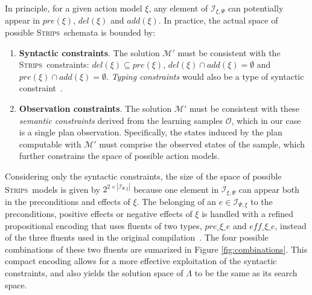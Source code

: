 \documentclass[runningheads]{llncs}
\newcommand{\strips}{\textsc{Strips}}     %
\begin{document}
In principle, for a given action model $\xi$, any element of ${\mathcal I}_{\xi,\Psi}$ can potentially appear in $pre(\xi)$, $del(\xi)$ and $add(\xi)$. In practice, the actual space of possible \strips\ schemata is bounded by:
\begin{enumerate}
\item {\bf Syntactic constraints}. The solution $\mathcal{M}'$ must be consistent with the \strips\ constraints: $del(\xi)\subseteq pre(\xi)$, $del(\xi)\cap add(\xi)=\emptyset$ and $pre(\xi)\cap add(\xi)=\emptyset$. {\em Typing constraints} would also be a type of syntactic constraint~\cite{mcdermott1998pddl}.
\item {\bf Observation constraints}. The solution $\mathcal{M}'$ must be consistent with these \emph{semantic constraints} derived from  the learning samples $\mathcal{O}$, which in our case is a single plan observation. Specifically, the states induced by the plan computable with $\mathcal{M}'$ must comprise the observed states of the sample, which further constrains the space of possible action models.
\end{enumerate}

Considering only the syntactic constraints, the size of the space of possible \strips\ models is given by $2^{2\times|{\mathcal I}_{\Psi,\xi}|}$ because one element in $\mathcal{I}_{\xi,\Psi}$ can appear both in the preconditions and effects of $\xi$. The belonging of an $e \in \mathcal{I}_{\Psi,\xi}$ to the preconditions, positive effects or negative effects of $\xi$ is handled with a refined propositional encoding that uses fluents of two types, $pre\_\xi\_e$ and $eff\_\xi\_e$, instead of the three fluents used in the original compilation~\cite{aineto2018learning}. The four possible combinations of these two fluents are sumarized in Figure \ref{fig:combinations}. This compact encoding allows for a more effective exploitation of the syntactic constraints, and also yields the solution space of $\Lambda$ to be the same as its search space.
\end{document}
